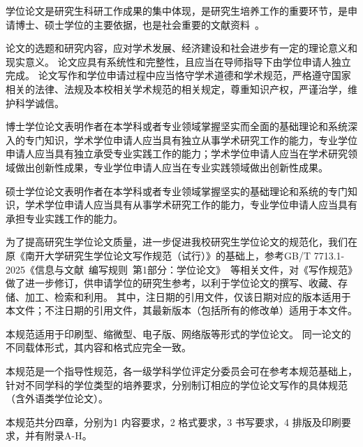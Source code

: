 \begin{preface}
    学位论文是研究生科研工作成果的集中体现，是研究生培养工作的重要环节，是申请博士、硕士学位的主要依据，也是社会重要的文献资料~\cite{REF00000001}。

    论文的选题和研究内容，应对学术发展、经济建设和社会进步有一定的理论意义和现实意义。
    论文应具有系统性和完整性，且应当在导师指导下由学位申请人独立完成。
    论文写作和学位申请过程中应当恪守学术道德和学术规范，严格遵守国家相关的法律、法规及本校相关学术规范的相关规定，尊重知识产权，严谨治学，维护科学诚信。

    博士学位论文表明作者在本学科或者专业领域掌握坚实而全面的基础理论和系统深入的专门知识，学术学位申请人应当具有独立从事学术研究工作的能力，专业学位申请人应当具有独立承受专业实践工作的能力；学术学位申请人应当在学术研究领域做出创新性成果，专业学位申请人应当在专业实践领域做出创新性成果。

    硕士学位论文表明作者在本学科或者专业领域掌握坚实的基础理论和系统的专门知识，学术学位申请人应当具有从事学术研究工作的能力，专业学位申请人应当具有承担专业实践工作的能力。

    为了提高研究生学位论文质量，进一步促进我校研究生学位论文的规范化，我们在原《南开大学研究生学位论文写作规范（试行）》的基础上，参考GB/T 7713.1-2025《信息与文献~编写规则~第1部分：学位论文》~\cite{SCSF00000378}等相关文件，对《写作规范》做了进一步修订，供申请学位的研究生参考，以利于学位论文的撰写、收藏、存储、加工、检索和利用。
    其中，注日期的引用文件，仅该日期对应的版本适用于本文件；不注日期的引用文件，其最新版本（包括所有的修改单）适用于本文件。

    本规范适用于印刷型、缩微型、电子版、网络版等形式的学位论文。
    同一论文的不同载体形式，其内容和格式应完全一致。

    本规范是一个指导性规范，各一级学科学位评定分委员会可在参考本规范基础上，针对不同学科的学位类型的培养要求，分别制订相应的学位论文写作的具体规范（含外语类学位论文）。

    本规范共分四章，分别为1 内容要求，2 格式要求，3 书写要求，4 排版及印刷要求，并有附录A-H。
\end{preface}
